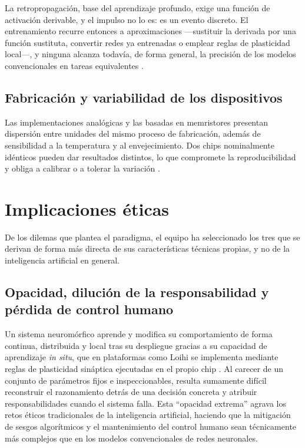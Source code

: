 \documentclass[a4paper,11pt,oneside]{book}
\begin{document}
La retropropagación, base del aprendizaje profundo, exige una función de
activación derivable, y el impulso no lo es: es un evento discreto. El
entrenamiento recurre entonces a aproximaciones —sustituir la derivada por una
función sustituta, convertir redes ya entrenadas o emplear reglas de plasticidad
local—, y ninguna alcanza todavía, de forma general, la precisión de los modelos
convencionales en tareas equivalentes \parencite{roy2019}.

\subsection{Fabricación y variabilidad de los dispositivos}

Las implementaciones analógicas y las basadas en memristores presentan dispersión
entre unidades del mismo proceso de fabricación, además de sensibilidad a la
temperatura y al envejecimiento. Dos chips nominalmente idénticos pueden dar
resultados distintos, lo que compromete la reproducibilidad y obliga a calibrar o
a tolerar la variación \parencite{indiveri2015}.

\section{Implicaciones éticas}
\label{sec:etica}

De los dilemas que plantea el paradigma, el equipo ha seleccionado los tres que
se derivan de forma más directa de sus características técnicas propias, y no de
la inteligencia artificial en general.

\subsection{Opacidad, dilución de la responsabilidad y pérdida de control humano}
Un sistema neuromórfico aprende y modifica su comportamiento de forma continua, distribuida y local tras su despliegue gracias a su capacidad de aprendizaje \textit{in situ}, que en plataformas como Loihi se implementa mediante reglas de plasticidad sináptica ejecutadas en el propio chip \parencite{davies2018}. Al carecer de un conjunto de parámetros fijos e inspeccionables, resulta sumamente difícil reconstruir el razonamiento detrás de una decisión concreta y atribuir responsabilidades cuando el sistema falla. Esta \enquote{opacidad extrema} agrava los retos éticos tradicionales de la inteligencia artificial, haciendo que la mitigación de sesgos algorítmicos y el mantenimiento del control humano sean técnicamente más complejos que en los modelos convencionales de redes neuronales.
\end{document}
